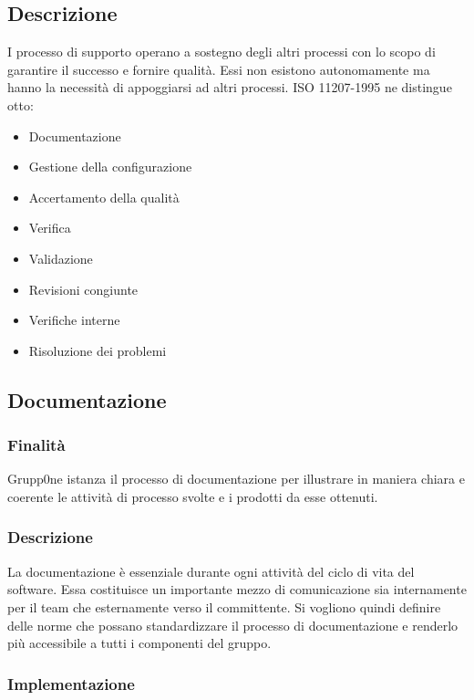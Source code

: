 \documentclass[../norme-di-progetto.tex]{subfiles}
\begin{document}
\subsection{Descrizione}
I processo di supporto operano a sostegno degli altri processi con lo scopo di garantire il successo e fornire qualità. Essi non esistono autonomamente ma hanno la necessità di appoggiarsi ad altri processi. ISO 11207-1995 ne distingue otto:
\begin{itemize}
	\item Documentazione
	\item Gestione della configurazione
	\item Accertamento della qualità
	\item Verifica
	\item Validazione
	\item Revisioni congiunte
	\item Verifiche interne
	\item Risoluzione dei problemi
\end{itemize} 
\subsection{Documentazione}
\subsubsection{Finalità}
Grupp0ne istanza il processo di documentazione per illustrare in maniera chiara e coerente le attività di processo svolte e i prodotti da esse ottenuti.
\subsubsection{Descrizione}
La documentazione è essenziale durante ogni attività del ciclo di vita del software. Essa costituisce un importante mezzo di comunicazione sia internamente per il team che esternamente verso il committente. Si vogliono quindi definire delle norme che possano standardizzare il processo di documentazione e renderlo più accessibile a tutti i componenti del gruppo.
\subsubsection{Implementazione}
\end{document}
